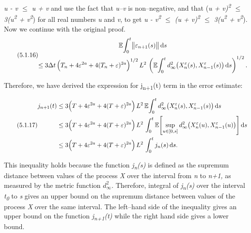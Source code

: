 \documentclass[12pt,a4paper]{report}
\numberwithin{equation}{section}
\begin{document}
\emph{\textbar\textbar u - v\textbar\textbar{} $\leq$
\textbar\textbar u\textbar\textbar{} +
\textbar\textbar v\textbar\textbar{}} and use the fact that
\textbar\textbar{}\emph{u--v}\textbar\textbar{} is non--negative, and that
(\emph{\textbar\textbar u\textbar\textbar{} +
\textbar\textbar v\textbar\textbar)\textsuperscript{2} $\leq$
3(\textbar\textbar u\textbar\textbar{}\textsuperscript{2} +
\textbar\textbar v\textbar\textbar{}\textsuperscript{2}}) for all real
numbers \textbar\textbar{}\emph{u}\textbar\textbar{} and
\textbar\textbar{}\emph{v}\textbar\textbar, to get
\textbar\textbar{}\emph{u - v\textbar\textbar{}\textsuperscript{2} $\leq$
(\textbar\textbar u\textbar\textbar{} +
\textbar\textbar v\textbar\textbar)\textsuperscript{2} $\leq$
3(\textbar\textbar u\textbar\textbar{}\textsuperscript{2} +
\textbar\textbar v\textbar\textbar{}\textsuperscript{2}}). Now we
continue with the original proof.
\begin{equation}\tag{5.1.16}\label{eq:5.1.16}
\begin{gathered}
\mathbb{E}\!\int_{0}^{t}\bigl\|\varepsilon_{n+1}(s)\bigr\|\,\mathrm{d}s \\
\le 3\Delta t\,
\Bigl(T_{n}+4\varepsilon^{2a}+4(T_{n}+\varepsilon)^{2a}\Bigr)^{1/2}\,
L^{2}\,
\left(\mathbb{E}\!\int_{0}^{t}
d_{\infty}^{2}\!\left(X_{n}^{\varepsilon}(s),X_{n-1}^{\varepsilon}(s)\right)\mathrm{d}s\right)^{1/2}.
\end{gathered}
\end{equation}


Therefore, we have derived the expression for j\textsubscript{n+1}(t)
term in the error estimate:

\begin{equation}\tag{5.1.17}\label{eq:5.1.17}
\begin{aligned}
j_{n+1}(t)
&\le 3\Bigl(T+4\varepsilon^{2a}+4(T+\varepsilon)^{2a}\Bigr)\,L^{2}\,
\mathbb{E}\!\int_{0}^{t}
d_{\infty}^{2}\!\left(X_{n}^{\varepsilon}(s),X_{n-1}^{\varepsilon}(s)\right)\mathrm{d}s \\
&\le 3\Bigl(T+4\varepsilon^{2a}+4(T+\varepsilon)^{2a}\Bigr)\,L^{2}\,
\int_{0}^{t}\mathbb{E}\!\left[\sup_{u\in[0,s]}
d_{\infty}^{2}\!\left(X_{n}^{\varepsilon}(u),X_{n-1}^{\varepsilon}(u)\right)\right]\mathrm{d}s \\
&\le 3\Bigl(T+4\varepsilon^{2a}+4(T+\varepsilon)^{2a}\Bigr)\,L^{2}\,
\int_{0}^{t} j_{n}(s)\,\mathrm{d}s .
\end{aligned}
\end{equation}


This inequality holds because the function \emph{j\textsubscript{n}(s)}
is defined as the supremum distance between values of the process
\emph{X} over the interval from \emph{n} to \emph{n+1,} as measured by
the metric function \(d_{\infty}^{2}.\) Therefore, integral of
\emph{j\textsubscript{n}(s)} over the interval \emph{t\textsubscript{0}}
to \emph{s} gives an upper bound on the supremum distance between values
of the process \emph{X} over the same interval. The left--hand side of
the inequality gives an upper bound on the function
\emph{j\textsubscript{n+1}(t)} while the right hand side gives a lower
bound.
\end{document}
